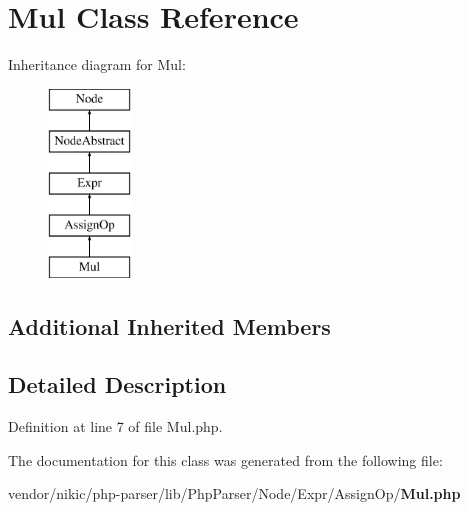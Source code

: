 \section{Mul Class Reference}
\label{class_php_parser_1_1_node_1_1_expr_1_1_assign_op_1_1_mul}
Inheritance diagram for Mul\+:\begin{figure}[H]
\begin{center}
\leavevmode
\includegraphics[height=5.000000cm]{class_php_parser_1_1_node_1_1_expr_1_1_assign_op_1_1_mul}
\end{center}
\end{figure}
\subsection*{Additional Inherited Members}


\subsection{Detailed Description}


Definition at line 7 of file Mul.\+php.



The documentation for this class was generated from the following file\+:\begin{DoxyCompactItemize}
\item 
vendor/nikic/php-\/parser/lib/\+Php\+Parser/\+Node/\+Expr/\+Assign\+Op/{\bf Mul.\+php}\end{DoxyCompactItemize}
